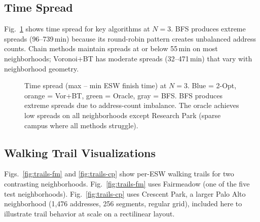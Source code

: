 \documentclass[conference]{IEEEtran}
\begin{document}
\subsection{Time Spread}

Fig.~\ref{fig:spread} shows time spread for key algorithms at $N = 3$. BFS produces extreme spreads (96--739\,min) because its round-robin pattern creates unbalanced address counts. Chain methods maintain spreads at or below 55\,min on most neighborhoods; Voronoi+BT has moderate spreads (32--471\,min) that vary with neighborhood geometry.

\begin{figure}[htbp]
\centering
{}
\caption{Time spread (max -- min ESW finish time) at $N = 3$. Blue = 2-Opt, orange = Vor+BT, green = Oracle, gray = BFS. BFS produces extreme spreads due to address-count imbalance. The oracle achieves low spreads on all neighborhoods except Research Park (sparse campus where all methods struggle).}
\label{fig:spread}
\end{figure}

\subsection{Walking Trail Visualizations}

Figs.~\ref{fig:trails-fm} and \ref{fig:trails-cp} show per-ESW walking trails for two contrasting neighborhoods. Fig.~\ref{fig:trails-fm} uses Fairmeadow (one of the five test neighborhoods). Fig.~\ref{fig:trails-cp} uses Crescent Park, a larger Palo Alto neighborhood (1,476 addresses, 256 segments, regular grid), included here to illustrate trail behavior at scale on a rectilinear layout.
\end{document}
